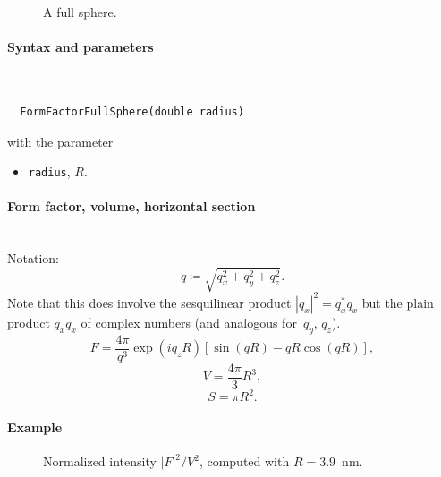 \begin{figure}[H]
\hfill
{}
\hfill
{}
\hfill
{}
\hfill
\caption{A full sphere.}
\end{figure}

\FloatBarrier

\paragraph{Syntax and parameters}\strut\\[-2ex plus .2ex minus .2ex]
\begin{lstlisting}
  FormFactorFullSphere(double radius)
\end{lstlisting}
with the parameter
\begin{itemize}
\item \texttt{radius}, $R$.
\end{itemize}

\paragraph{Form factor, volume, horizontal section}\strut\\
Notation:
\begin{equation*}
  q \coloneqq \sqrt{q_x^2+q_y^2+q_z^2}.
\end{equation*}
Note that this does  involve the sesquilinear product
$|q_x|^2=q_x^* q_x$ but the plain product $q_xq_x$ of complex numbers
(and analogous for~$q_y$, $q_z$).
\begin{equation*}
F = \frac{4\pi}{q^3} \exp(iq_z R)\left[\sin(qR) - qR \cos(qR)\right],
\end{equation*}
\begin{equation*}
  V = \dfrac{4\pi}{3}R^3,
\end{equation*}
\begin{equation*}
  S= \pi R^2.
\end{equation*}

\paragraph{Example}\nopagebreak\strut\nopagebreak

\begin{figure}[H]
\begin{center}
\end{center}
\caption{Normalized intensity $|F|^2/V^2$,
computed with $R=3.9$~nm.}
\end{figure}

